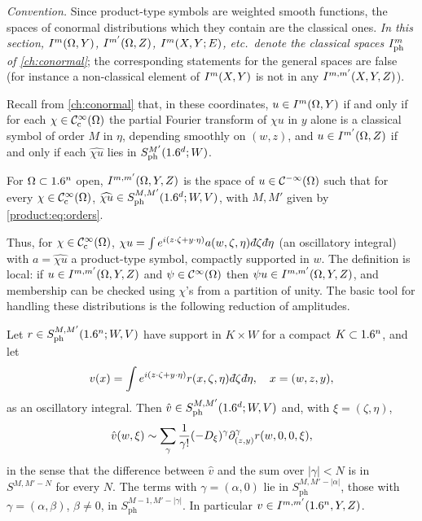 \emph{Convention.} Since product-type symbols are weighted smooth functions, the
spaces of conormal distributions which they contain are the classical ones.
\emph{In this section, $I^{m}(\Omega,Y)$, $I^{m'}(\Omega,Z)$, $I^{m}(X,Y;E)$, etc.\
denote the classical spaces $I^{m}_{\mathrm{ph}}$ of \cref{ch:conormal}}; the
corresponding statements for the general spaces are false (for instance a
non-classical element of $I^{m}(X,Y)$ is not in any $I^{m,m'}(X,Y,Z)$).

Recall from
\cref{ch:conormal} that, in these coordinates, $u\in I^{m}(\Omega,Y)$ if and only
if for each $\chi\in\mathcal{C}^\infty_{\mathrm{c}}(\Omega)$ the partial Fourier transform of $\chi u$ in $y$
alone is a classical symbol of order $M$ in $\eta$, depending smoothly on $(w,z)$,
and $u\in I^{m'}(\Omega,Z)$ if and only if each $\widehat{\chi u}$ lies in
$S^{M'}_{\mathrm{ph}}(1.6^d;W)$.

\begin{definition}\label{product:def:model-conormal}
For $\Omega\subset1.6^n$ open, $I^{m,m'}(\Omega,Y,Z)$ is the space of
$u\in\mathcal{C}^{-\infty}(\Omega)$ such that for every $\chi\in\mathcal{C}^\infty_{\mathrm{c}}(\Omega)$,
$\widehat{\chi u}\in S^{M,M'}_{\mathrm{ph}}(1.6^d;W,V)$, with $M,M'$ given by
\eqref{product:eq:orders}.
\end{definition}

Thus, for $\chi\in\mathcal{C}^\infty_{\mathrm{c}}(\Omega)$, $\chi u=\int e^{i(z\cdot\zeta+y\cdot\eta)}
a(w,\zeta,\eta)\,\dbar\zeta\,\dbar\eta$ (an oscillatory integral) with
$a=\widehat{\chi u}$ a product-type symbol, compactly supported in $w$. The
definition is local: if $u\in I^{m,m'}(\Omega,Y,Z)$ and $\psi\in\mathcal{C}^\infty(\Omega)$
then $\psi u\in I^{m,m'}(\Omega,Y,Z)$, and membership can be checked using
$\chi$'s from a partition of unity. The basic tool for handling these
distributions is the following reduction of amplitudes.

\begin{lemma}[Amplitudes]\label{product:lem:amplitude}
Let $r\in S^{M,M'}_{\mathrm{ph}}(1.6^n;W,V)$ have support in $K\times W$ for a
compact $K\subset1.6^n$, and let
\begin{equation*}
v(x)=\int e^{i(z\cdot\zeta+y\cdot\eta)}r(x,\zeta,\eta)\,\dbar\zeta\,\dbar\eta,
\quad x=(w,z,y),
\end{equation*}
as an oscillatory integral. Then $\hat v\in S^{M,M'}_{\mathrm{ph}}(1.6^d;W,V)$ and,
with $\xi=(\zeta,\eta)$,
\begin{equation}\label{product:eq:amplitude-expansion}
\hat v(w,\xi)\sim\sum_{\gamma}\frac1{\gamma!}(-D_\xi)^\gamma\partial_{(z,y)}^\gamma
r(w,0,0,\xi),
\end{equation}
in the sense that the difference between $\hat v$ and the sum over
$|\gamma|<N$ is in $S^{M,M'-N}$ for every $N$. The terms with $\gamma=(\alpha,0)$
lie in $S^{M,M'-|\alpha|}_{\mathrm{ph}}$, those with $\gamma=(\alpha,\beta)$,
$\beta\ne0$, in $S^{M-1,M'-|\gamma|}_{\mathrm{ph}}$.
In particular $v\in I^{m,m'}(1.6^n,Y,Z)$.
\end{lemma}

